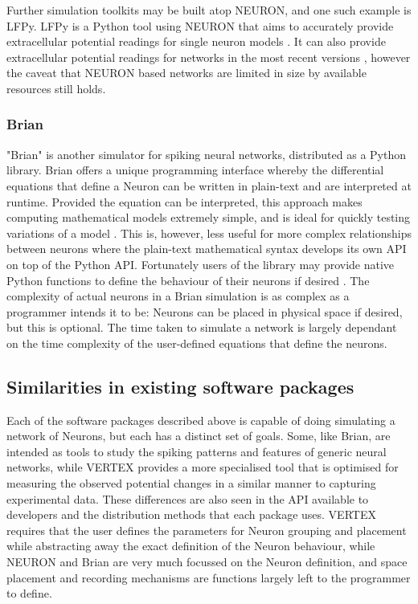 Further simulation toolkits may be built atop NEURON, and one such example is
LFPy. LFPy is a Python tool using NEURON that aims to accurately provide
extracellular potential readings for single neuron models
\autocite{hagen_hybrid_2016}. It can also provide extracellular potential
readings for networks in the most recent versions \autocite{hagen_lfpy_2019},
however the caveat that NEURON based networks are limited in size by available
resources still holds.

\subsubsection{Brian}

"Brian" is another simulator for spiking neural networks, distributed as a
Python library. Brian offers a unique programming interface whereby the
differential equations that define a Neuron can be written in plain-text and are
interpreted at runtime. Provided the equation can be interpreted, this approach
makes computing mathematical models extremely simple, and is ideal for quickly
testing variations of a model \autocite{stimberg_brian_2019}. This is, however,
less useful for more complex relationships between neurons where the plain-text
mathematical syntax develops its own API on top of the Python API. Fortunately
users of the library may provide native Python functions to define the behaviour
of their neurons if desired \autocite{noauthor_functions_2020}. The complexity
of actual neurons in a Brian simulation is as complex as a programmer intends it
to be: Neurons can be placed in physical space if desired, but this is optional.
The time taken to simulate a network is largely dependant on the time complexity
of the user-defined equations that define the neurons.

\subsection{Similarities in existing software packages}

Each of the software packages described above is capable of doing simulating a
network of Neurons, but each has a distinct set of goals. Some, like Brian, are
intended as tools to study the spiking patterns and features of generic neural
networks, while VERTEX provides a more specialised tool that is optimised for
measuring the observed potential changes in a similar manner to capturing
experimental data. These differences are also seen in the API available to
developers
and the distribution methods that each package uses. VERTEX requires that the
user defines the parameters for Neuron grouping and placement while abstracting
away the exact definition of the Neuron behaviour, while NEURON and Brian are
very much focussed on the Neuron definition, and space placement and recording
mechanisms are functions largely left to the programmer to define.